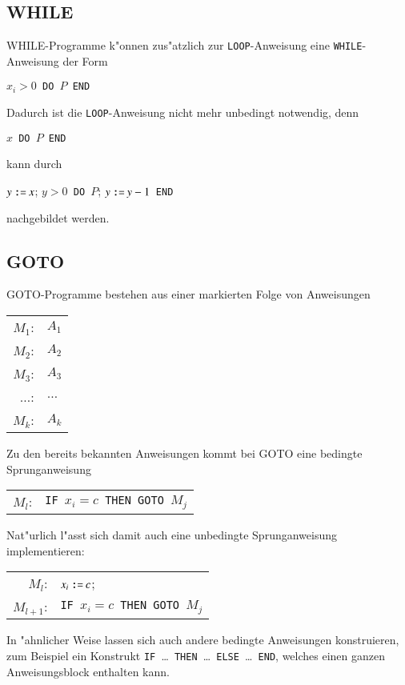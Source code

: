 \subsection{WHILE}
WHILE-Programme k"onnen zus"atzlich zur {\tt LOOP}-Anweisung
eine {\tt WHILE}-Anweisung der Form
\begin{algorithmic}
$x_i>0${\tt\ DO }$P${\tt\ END}
\end{algorithmic}
Dadurch ist die {\tt LOOP}-Anweisung nicht mehr unbedingt
notwendig, denn
\begin{algorithmic}
$x${\tt\ DO }$P${\tt\ END}
\end{algorithmic}
kann durch
\begin{algorithmic}
\STATE$y \mathbin{\texttt{:=}} x$;
$y>0${\tt\ DO }$P$; $y \mathbin{\texttt{:=}} y-1${\tt\ END}
\end{algorithmic}
nachgebildet werden.

\subsection{GOTO}
GOTO-Programme bestehen aus einer markierten Folge von Anweisungen
\begin{center}
\begin{tabular}{rl}
$M_1$:&$A_1$\\
$M_2$:&$A_2$\\
$M_3$:&$A_3$\\
$\dots$:&$\dots$\\
$M_k$:&$A_k$
\end{tabular}
\end{center}
Zu den bereits bekannten Anweisungen kommt bei GOTO eine bedingte
Sprunganweisung
\begin{center}
\begin{tabular}{rl}
$M_l$:&{\tt IF\ }$x_i=c${\tt\ THEN GOTO\ }$M_j$
\end{tabular}
\end{center}
Nat"urlich l"asst sich damit auch eine unbedingte Sprunganweisung
implementieren:
\begin{center}
\begin{tabular}{rl}
$M_l$:&$x_i \mathbin{\texttt{:=}} c$;\\
$M_{l+1}$:&{\tt IF\ }$x_i=c${\tt\ THEN GOTO\ }$M_j$
\end{tabular}
\end{center}
In "ahnlicher Weise lassen sich auch andere bedingte Anweisungen
konstruieren, zum Beispiel ein
Konstrukt {\tt IF }\dots{\tt\ THEN }\dots{\tt\ ELSE }\dots{\tt\ END}, welches
einen ganzen Anweisungsblock enthalten kann.

